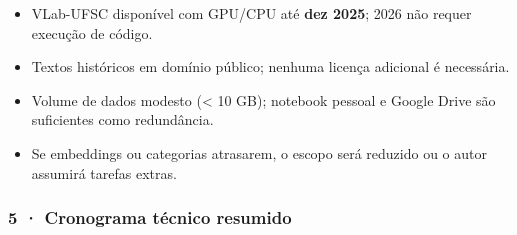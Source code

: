 \begin{itemize}
\tightlist
\item
  VLab-UFSC disponível com GPU/CPU até \textbf{dez 2025}; 2026 não
  requer execução de código.\\
\item
  Textos históricos em domínio público; nenhuma licença adicional é
  necessária.\\
\item
  Volume de dados modesto (\textless{} 10 GB); notebook pessoal e Google
  Drive são suficientes como redundância.\\
\item
  Se embeddings ou categorias atrasarem, o escopo será reduzido ou o
  autor assumirá tarefas extras.
\end{itemize}

\subsubsection{5 · Cronograma técnico
resumido}\label{cronograma-tuxe9cnico-resumido}

